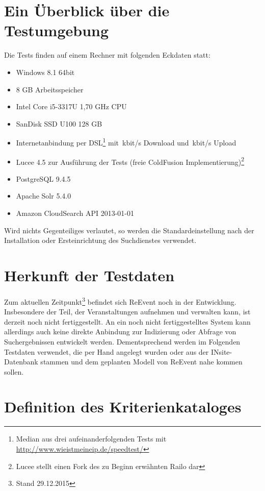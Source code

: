 \section{Ein Überblick über die Testumgebung} %
\label{sec:testumgebung}

Die Tests finden auf einem Rechner mit folgenden Eckdaten statt:
\begin{itemize}
	\item Windows 8.1 64bit
	\item 8 GB Arbeitsspeicher
	\item Intel Core i5-3317U 1,70 GHz CPU
	\item SanDisk SSD U100 128 GB
	\item Internetanbindung per DSL\footnote{Median aus drei aufeinanderfolgenden Tests mit \url{http://www.wieistmeineip.de/speedtest/}} mit \,kbit/s Download und  \,kbit/s Upload
	\item Lucee 4.5 zur Ausführung der Tests (freie ColdFusion Implementierung)\footnote{Lucee stellt einen Fork des zu Beginn erwähnten Railo dar}
	\item PostgreSQL 9.4.5
	\item Apache Solr 5.4.0
	\item Amazon CloudSearch API 2013-01-01
\end{itemize}

Wird nichts Gegenteiliges verlautet, so werden die Standardeinstellung nach der Installation oder Ersteinrichtung des Suchdienstes verwendet.


\section{Herkunft der Testdaten} %
\label{sec:testdaten}

Zum aktuellen Zeitpunkt\footnote{Stand 29.12.2015} befindet sich ReEvent noch in der Entwicklung. Insbesondere der Teil, der Veranstaltungen aufnehmen und verwalten kann, ist derzeit noch nicht fertiggestellt. An ein noch nicht fertiggestelltes System kann allerdings auch keine direkte Anbindung zur Indizierung oder Abfrage von Suchergebnissen entwickelt werden. Dementsprechend werden im Folgenden Testdaten verwendet, die per Hand angelegt wurden oder aus der INsite-Datenbank stammen und dem geplanten Modell von ReEvent nahe kommen sollen.


\section{Definition des Kriterienkataloges} %
\label{sec:kriterienkatalog}

